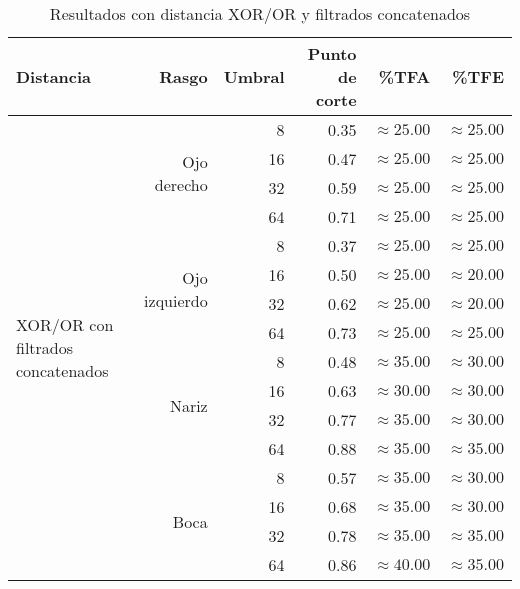 \begin{table}
\begin{tabular}{|l|r|r|r|r|r|}
 \hline
  Distancia & Rasgo & Umbral & Punto de corte & \%TFA  & \%TFE \\
  \hline \hline
  \multirow{16}{*}{XOR/OR con filtrados concatenados}
& \multirow{4}{*}{Ojo derecho} & 8  & 0.35 & $\approx 25.00$ & $\approx 25.00$ \\
& & 16 & 0.47 & $\approx 25.00$ & $\approx 25.00$ \\
& & 32 & 0.59 & $\approx 25.00$ & $\approx 25.00$ \\
& & 64 & 0.71 & $\approx 25.00$ & $\approx 25.00$ \\ \cline{2-6}

& \multirow{4}{*}{Ojo izquierdo} & 8  & 0.37 & $\approx 25.00$ & $\approx 25.00$ \\
& & 16 & 0.50 & $\approx 25.00$ & $\approx 20.00$ \\
& & 32 & 0.62 & $\approx 25.00$ & $\approx 20.00$ \\
& & 64 & 0.73 & $\approx 25.00$ & $\approx 25.00$ \\ \cline{2-6}

& \multirow{4}{*}{Nariz} & 8  & 0.48 & $\approx 35.00$ & $\approx 30.00$ \\
& & 16 & 0.63 & $\approx 30.00$ & $\approx 30.00$ \\
& & 32 & 0.77 & $\approx 35.00$ & $\approx 30.00$ \\
& & 64 & 0.88 & $\approx 35.00$ & $\approx 35.00$ \\ \cline{2-6}

& \multirow{4}{*}{Boca} & 8  & 0.57 & $\approx 35.00$ & $\approx 30.00$ \\
& & 16 & 0.68 & $\approx 35.00$ & $\approx 30.00$ \\
& & 32 & 0.78 & $\approx 35.00$ & $\approx 35.00$ \\
& & 64 & 0.86 & $\approx 40.00$ & $\approx 35.00$ \\ \hline

 \end{tabular}
 \caption{Resultados con distancia XOR/OR y filtrados concatenados}
 \label{tab:xor_con}
\end{table}
